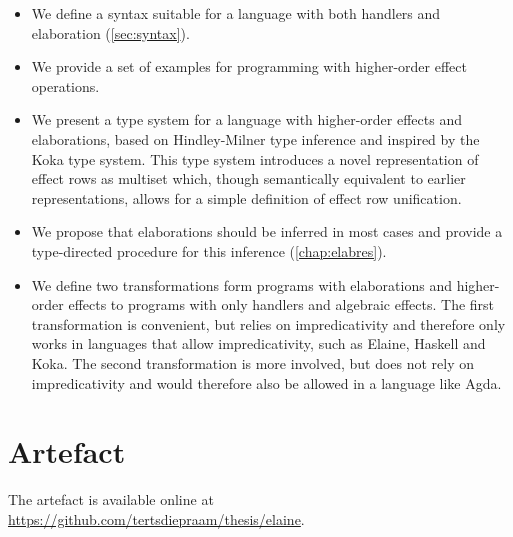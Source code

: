 \begin{itemize}
    \item We define a syntax suitable for a language with both handlers and elaboration (\cref{sec:syntax}).
    \item We provide a set of examples for programming with higher-order effect operations.
    \item We present a type system for a language with higher-order effects and elaborations, based on Hindley-Milner type inference and inspired by the Koka type system. This type system introduces a novel representation of effect rows as multiset which, though semantically equivalent to earlier representations, allows for a simple definition of effect row unification.
    \item We propose that elaborations should be inferred in most cases and provide a type-directed procedure for this inference (\cref{chap:elabres}).
    \item We define two transformations form programs with elaborations and higher-order effects to programs with only handlers and algebraic effects. The first transformation is convenient, but relies on impredicativity and therefore only works in languages that allow impredicativity, such as Elaine, Haskell and Koka. The second transformation is more involved, but does not rely on impredicativity and would therefore also be allowed in a language like Agda.
\end{itemize}

\section{Artefact}


The artefact is available online at \url{https://github.com/tertsdiepraam/thesis/elaine}.
